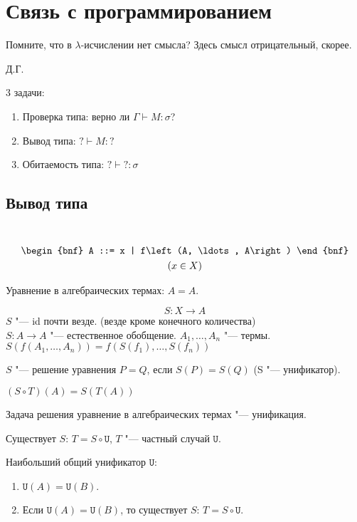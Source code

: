 \section{Связь с программированием}

\epigraph{Помните, что в $\lambda$-исчислении нет смысла? Здесь смысл отрицательный, скорее.}{Д.Г.}

3 задачи:
\begin{enumerate}[label=(\alph*)]
    \item Проверка типа: верно ли $\Gamma \vdash M : \sigma$?
    \item Вывод типа: $? \vdash M : ?$
    \item Обитаемость типа: $? \vdash ? : \sigma$
\end{enumerate}

\subsection{Вывод типа}

\begin{definition} \ \\
    \begin{gather*}
        \begin{bnf}
            A ::= x | f\left(A, \ldots, A\right)
        \end{bnf} \\
        (x \in X)
    \end{gather*}
\end{definition}

Уравнение в алгебраических термах: $A = A$.

\begin{definition}[$S$-подстановка]
    \[
        S : X \rightarrow A
    \]
    $S$ "--- id почти везде. (везде кроме конечного количества) \\
    $S : A \rightarrow A$ "--- естественное обобщение. $A_1, \ldots, A_n$ "--- термы.
    $S\left(f\left(A_1, \dots, A_n\right)\right) = f\left(S(f_1), \ldots, S(f_n)\right)$
\end{definition}

\begin{definition}
    $S$ "--- решение уравнения $P=Q$, если $S(P)=S(Q)$ (S "--- унификатор).
\end{definition}
\begin{definition}
    $(S \circ T)(A) = S(T(A))$
\end{definition}
Задача решения уравнение в алгебраических термах "--- унификация.
\begin{definition}
    Существует $S$: $T = S \circ \texttt{U}$, $T$ "--- частный случай $\texttt{U}$.
\end{definition}
\begin{definition}
    Наибольший общий унификатор $\texttt{U}$:
    \begin{enumerate}
        \item $\texttt{U}(A)=\texttt{U}(B)$.
        \item Если $\texttt{U}(A)=\texttt{U}(B)$, то существует $S$: $T = S \circ \texttt{U}$.
    \end{enumerate}
\end{definition}

